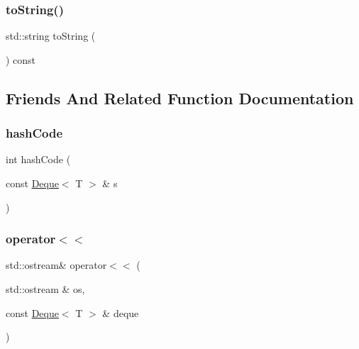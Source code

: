 \subsubsection{\texorpdfstring{to\+String()}{toString()}}
{\footnotesize\ttfamily std\+::string to\+String (\begin{DoxyParamCaption}{ }\end{DoxyParamCaption}) const}



\subsection{Friends And Related Function Documentation}
\mbox{\label{classDeque_aa9e4a693df95cedc23d501cce865d9af}} 
\subsubsection{\texorpdfstring{hash\+Code}{hashCode}}
{\footnotesize\ttfamily int hash\+Code (\begin{DoxyParamCaption}\item[{const \mbox{\hyperlink{classDeque}{Deque}}$<$ T $>$ \&}]{s }\end{DoxyParamCaption})\hspace{0.3cm}{\ttfamily [friend]}}

\mbox{\label{classDeque_a369ddf8d137598b1bf09d82fbcae587c}} 
\subsubsection{\texorpdfstring{operator$<$$<$}{operator<<}}
{\footnotesize\ttfamily std\+::ostream\& operator$<$$<$ (\begin{DoxyParamCaption}\item[{std\+::ostream \&}]{os,  }\item[{const \mbox{\hyperlink{classDeque}{Deque}}$<$ T $>$ \&}]{deque }\end{DoxyParamCaption})\hspace{0.3cm}{\ttfamily [friend]}}

